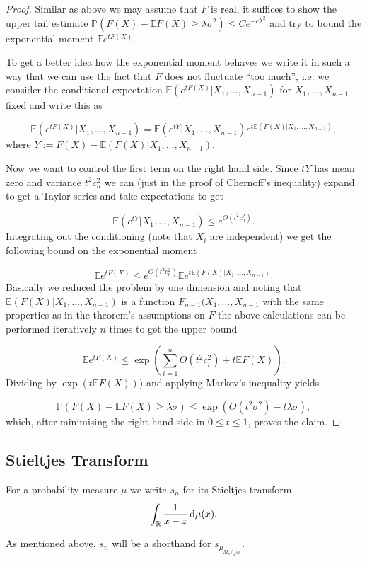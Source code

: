 \begin{proof}
	Similar as above we may assume that $F$ is real, it suffices to show the upper tail estimate $\mathbb P(F(X)-\mathbb EF(X)\geq\lambda\sigma^2)\leq Ce^{-c\lambda^2}$ and try to bound the exponential moment $\mathbb Ee^{tF(X)}$.
	
	To get a better idea how the exponential moment behaves we write it in such a way that we can use the fact that $F$ does not fluctuate ``too much'', i.e. we consider the conditional expectation $\mathbb E(e^{tF(X)}|X_1,\dots,X_{n-1})$ for $X_1,\dots,X_{n-1}$ fixed and write this as
	
	$$\mathbb E(e^{tF(X)}|X_1,\dots,X_{n-1}) = \mathbb E(e^{tY}|X_1,\dots,X_{n-1})e^{t\mathbb E(F(X)|X_1,\dots,X_{n-1})},$$
	where $Y:=F(X)-\mathbb E(F(X)|X_1,\dots,X_{n-1})$.
	
	Now we want to control the first term on the right hand side.
	Since $tY$ has mean zero and variance $t^2c_n^2$ we can (just in the proof of Chernoff's inequality) expand to get a Taylor series and take expectations to get
	
	$$\mathbb E(e^{tY}|X_1,\dots,X_{n-1}) \leq e^{O(t^2c_n^2)}.$$
	Integrating out the conditioning (note that $X_i$ are independent) we get the following bound on the exponential moment
	
	$$\mathbb Ee^{tF(X)} \leq e^{O(t^2c_n^2)}\mathbb E e^{t\mathbb E(F(X)|X_1,\dots,X_{n-1})}.$$
	Basically we reduced the problem by one dimension and noting that \newline$\mathbb E(F(X)|X_1,\dots,X_{n-1})$ is a function $F_{n-1}(X_1,\dots,X_{n-1}$ with the same properties as in the theorem's assumptions on $F$ the above calculations can be performed iteratively $n$ times to get the upper bound
	
	$$\mathbb Ee^{tF(X)}\leq \exp\left(\sum_{i=1}^n O(t^2c_i^2) + t\mathbb EF(X)\right).$$
	Dividing by $\exp(t\mathbb EF(X)))$ and applying Markov's inequality yields
	
	$$\mathbb P(F(X)-\mathbb EF(X)\geq\lambda\sigma) \leq \exp(O(t^2\sigma^2)-t\lambda\sigma),$$
	which, after minimising the right hand side in $0\leq t\leq 1$, proves the claim.
\end{proof}


\subsection{Stieltjes Transform}

\begin{definition}
	For a probability measure $\mu$ we write $s_\mu$ for its Stieltjes transform $$\int_\mathbb{R} \frac{1}{x-z}\mathop{}\!\mathrm{d}\mu(x).$$
\end{definition}
As mentioned above, $s_n$ will be a shorthand for $s_{\mu_{M_n/\sqrt{n}}}$.

